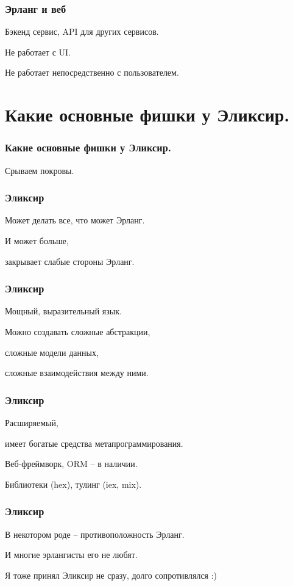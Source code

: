 \documentclass[10pt]{beamer}
\begin{document}
\begin{frame}
\frametitle{Эрланг и веб}
\centering
Бэкенд сервис, API для других сервисов.
\par \bigskip
Не работает с UI.
\par \bigskip
Не работает непосредственно с пользователем.
\end{frame}


\section{Какие основные фишки у Эликсир.}

{
\begin{frame}
\frametitle{Какие основные фишки у Эликсир.}
\centering
Срываем покровы.
\end{frame}
}

\begin{frame}
\frametitle{Эликсир}
\centering
Может делать все, что может Эрланг.
\par \bigskip
И может больше,
\par
закрывает слабые стороны Эрланг.
\end{frame}

\begin{frame}
\frametitle{Эликсир}
\centering
Мощный, выразительный язык.
\par \bigskip
Можно создавать сложные абстракции,
\par
сложные модели данных,
\par
сложные взаимодействия между ними.
\end{frame}

\begin{frame}
\frametitle{Эликсир}
\centering
Расширяемый,
\par
имеет богатые средства метапрограммирования.
\par \bigskip
Веб-фреймворк, ORM -- в наличии.
\par \bigskip
Библиотеки (hex), тулинг (iex, mix).
\end{frame}

\begin{frame}
\frametitle{Эликсир}
\centering
В некотором роде -- противоположность Эрланг.
\par \bigskip
И многие эрлангисты его не любят.
\par \bigskip
Я тоже принял Эликсир не сразу, долго сопротивлялся :)
\end{frame}
\end{document}
